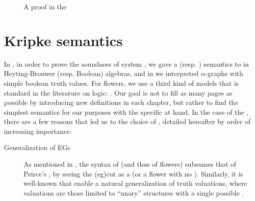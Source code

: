 \begin{scope}
\begin{figure*}
  \centering
  
  \par\bigskip
  
  \caption{A  proof in the }
\end{figure*}

\section{Kripke semantics}

In , in order to prove the soundness of system
, we gave a  (resp. ) semantics to  in
Heyting-Brouwer (resp. Boolean) algebras, and in  we
interpreted $\alpha$-graphs with simple boolean truth values. For flowers, we
use a third kind of models that is standard in the literature on 
logic: . Our goal is not to fill as many pages as possible by
introducing new definitions in each chapter, but rather to find the simplest
semantics for our purposes with the specific  at hand. In the case
of the , there are a few reasons that led us to the choice of
, detailed hereafter by order of increasing importance:
\begin{description}
  \item[Generalization of EGs]
    As mentioned in , the syntax of  
    (and thus of flowers) subsumes that of Peirce's  , by
    seeing the \kl(eg){cut} as a  (or a
    flower with no ). Similarly, it is well-known that  enable a natural generalization of truth valuations, where
     valuations are those limited to ``unary'' structures with a
    single possible .
  

\end{description}
\end{scope}
